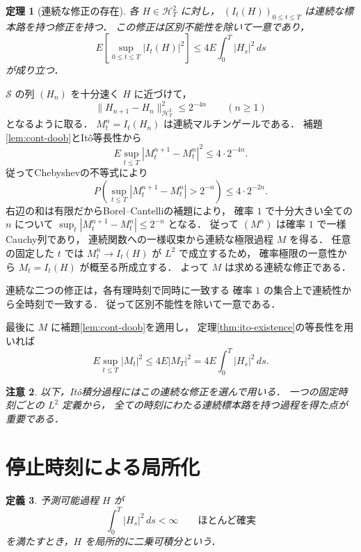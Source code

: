 \documentclass[a5paper,10pt,onecolumn]{jsarticle}
\makeatletter
\theoremstyle{mathnotetheorem}
\newtheorem{theorem}{定理}[section]
\newtheorem{definition}[theorem]{定義}
\newtheorem{remark}[theorem]{注意}
\renewcommand{\proofname}{証明}
\renewenvironment{proof}[1][\proofname]{%
  \par\pushQED{\qed}\normalfont\topsep4\p@\@plus2\p@\relax
  \trivlist\item[\hskip\labelsep\bfseries #1]\ignorespaces
}{\popQED\endtrivlist\@endpefalse}
\newcommand{\norm}[1]{\lVert #1\rVert}
\makeatother
\begin{document}
\begin{theorem}[連続な修正の存在]\label{thm:ito-continuity}
各 $H\in\mathcal H^2_T$ に対し，
$(I_t(H))_{0\le t\le T}$ は連続な標本路を持つ修正を持つ．
この修正は区別不能性を除いて一意であり，
\[
 E\left[\sup_{0\le t\le T}|I_t(H)|^2\right]
 \le4E\int_0^T|H_s|^2\,ds
\]
が成り立つ．
\end{theorem}
\begin{proof}
$\mathcal S$ の列 $(H_n)$ を十分速く $H$ に近づけて，
\[
 \norm{H_{n+1}-H_n}_{\mathcal H^2_T}^2\le2^{-4n}
 \qquad(n\ge1)
\]
となるように取る．
$M^n_t=I_t(H_n)$ は連続マルチンゲールである．
補題\ref{lem:cont-doob}とIt\^o等長性から
\[
 E\sup_{t\le T}|M^{n+1}_t-M^n_t|^2
 \le4\cdot2^{-4n}.
\]
従ってChebyshevの不等式により
\[
 P\left(\sup_{t\le T}|M^{n+1}_t-M^n_t|>2^{-n}\right)
 \le4\cdot2^{-2n}.
\]
右辺の和は有限だからBorel--Cantelliの補題により，
確率 $1$ で十分大きい全ての $n$ について
$\sup_t|M^{n+1}_t-M^n_t|\le2^{-n}$ となる．
従って $(M^n)$ は確率 $1$ で一様Cauchy列であり，
連続関数への一様収束から連続な極限過程 $M$ を得る．
任意の固定した $t$ では
$M^n_t\to I_t(H)$ が $L^2$ で成立するため，
確率極限の一意性から $M_t=I_t(H)$ が概至る所成立する．
よって $M$ は求める連続な修正である．

連続な二つの修正は，各有理時刻で同時に一致する
確率 $1$ の集合上で連続性から全時刻で一致する．
従って区別不能性を除いて一意である．

最後に $M$ に補題\ref{lem:cont-doob}を適用し，
定理\ref{thm:ito-existence}の等長性を用いれば
\[
 E\sup_{t\le T}|M_t|^2
 \le4E|M_T|^2
 =4E\int_0^T|H_s|^2\,ds.
\]
\end{proof}

\begin{remark}
以下，It\^o積分過程にはこの連続な修正を選んで用いる．
一つの固定時刻ごとの $L^2$ 定義から，
全ての時刻にわたる連続標本路を持つ過程を得た点が重要である．
\end{remark}

\section{停止時刻による局所化}

\begin{definition}
予測可能過程 $H$ が
\[
 \int_0^T|H_s|^2\,ds<\infty
 \qquad\text{ほとんど確実}
\]
を満たすとき，$H$ を\emph{局所的に二乗可積分}という．
\end{definition}
\end{document}
